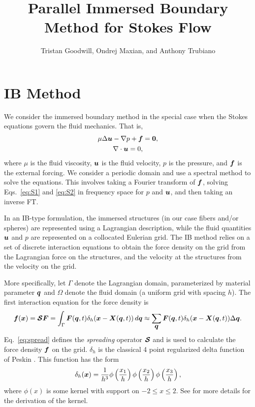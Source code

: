 \documentclass[]{article}
\title{Parallel Immersed Boundary Method for Stokes Flow}
\author{Tristan Goodwill, Ondrej Maxian, and Anthony Trubiano}
\newcommand{\bm}[1]{\mbox{\boldmath $ #1 $}}    %
\renewcommand{\vec}[1]{\bm{#1}}                 %
\begin{document}
\maketitle

\section{IB Method}
We consider the immersed boundary method in the special case when the Stokes equations govern the fluid mechanics. That is, 
\begin{gather}
\label{eq:S1}
\mu \Delta \bm{u} - \nabla p + \bm{f} = \bm{0}, \\
\label{eq:S2}
\nabla \cdot \bm{u} = 0,
\end{gather}
where $\mu$ is the fluid viscosity, $\vec{u}$ is the fluid velocity, $p$ is the pressure, and $\vec{f}$ is the external forcing. We consider a periodic domain and use a spectral method to solve the equations. This involves taking a Fourier transform of $\bm{f}$, solving Eqs.\ \eqref{eq:S1} and \eqref{eq:S2} in frequency space for $p$ and $\bm{u}$, and then taking an inverse FT. 

In an IB-type formulation, the immersed structures (in our case fibers and/or spheres) are represented using a Lagrangian description, while the fluid quantities $\bm{u}$ and $p$ are represented on a collocated Eulerian grid. The IB method relies on a set of discrete interaction equations to obtain the force density on the grid from the Lagrangian force on the structures, and the velocity at the structures from the velocity on the grid. 

More specifically, let $\Gamma$ denote the Lagrangian domain, parameterized by material parameter $\bm{q}$ and $\Omega$ denote the fluid domain (a uniform grid with spacing $h$). The first interaction equation for the force density is 
\begin{equation}
\label{eq:spread}
\bm{f}(\bm{x}) = \bm{\mathcal{S}} \bm{F}  = \int_{\Gamma}  \bm{F}(\bm{q},t) \delta_h (\bm{x} - \bm{X}(\bm{q},t))\, d \bm{q}  \approx \sum_{\bm{q}} \bm{F}(\bm{q},t) \delta_h (\bm{x} - \bm{X}(\bm{q},t)) \Delta \bm{q}. 
\end{equation}
Eq.\ \eqref{eq:spread} defines the \textit{spreading} operator $\bm{\mathcal{S}}$ and is used to calculate the force density $\bm{f}$ on the grid. $\delta_h$ is the classical 4 point regularized delta function of Peskin \cite{peskin2002acta}. This function has the form
\begin{equation}
\delta_h(\bm{x}) = \frac{1}{h^3} \phi\left(\frac{x_1}{h}\right) \phi\left(\frac{x_2}{h}\right) \phi\left(\frac{x_3}{h}\right), 
\end{equation}
where $\phi(x)$ is some kernel with support on $-2 \leq x \leq 2$. See \cite{peskin2002acta} for more details for the derivation of the kernel. 
\end{document}
